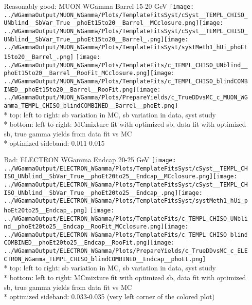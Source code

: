 \documentclass{beamer}
\begin{document}
\begin{frame}{Reasonably good: MUON WGamma Barrel 15-20 GeV}
  \texttt{[image: ../WGammaOutput/MUON\_WGamma/Plots/TemplateFitsSyst/cSyst\_\_TEMPL\_CHISO\_UNblind\_\_SbVar\_True\_\_phoEt15to20\_\_Barrel\_\_MCclosure.png]}\texttt{[image: ../WGammaOutput/MUON\_WGamma/Plots/TemplateFitsSyst/cSyst\_\_TEMPL\_CHISO\_UNblind\_\_SbVar\_True\_\_phoEt15to20\_\_Barrel\_.png]}\texttt{[image: ../WGammaOutput/MUON\_WGamma/Plots/TemplateFitsSyst/systMeth1\_hUi\_phoEt15to20\_\_Barrel\_.png]}
  \texttt{[image: ../WGammaOutput/MUON\_WGamma/Plots/TemplateFits/c\_TEMPL\_CHISO\_UNblind\_\_phoEt15to20\_\_Barrel\_\_RooFit\_MCclosure.png]}\texttt{[image: ../WGammaOutput/MUON\_WGamma/Plots/TemplateFits/c\_TEMPL\_CHISO\_blindCOMBINED\_\_phoEt15to20\_\_Barrel\_\_RooFit.png]}\texttt{[image: ../WGammaOutput/MUON\_WGamma/Plots/PrepareYields/c\_TrueDDvsMC\_c\_MUON\_WGamma\_TEMPL\_CHISO\_blindCOMBINED\_\_Barrel\_\_phoEt.png]}\\*
  \scriptsize top: left to right: sb variation in MC, sb variation in data, syst study\\*
  \scriptsize bottom: left to right: MCmixture fit with optimized sb, data fit with optimized sb, true gamma yields from data fit vs MC\\*
  \scriptsize optimized sideband: 0.011-0.015
\end{frame}

\begin{frame}{Bad: ELECTRON WGamma Endcap 20-25 GeV}
  \texttt{[image: ../WGammaOutput/ELECTRON\_WGamma/Plots/TemplateFitsSyst/cSyst\_\_TEMPL\_CHISO\_UNblind\_\_SbVar\_True\_\_phoEt20to25\_\_Endcap\_\_MCclosure.png]}\texttt{[image: ../WGammaOutput/ELECTRON\_WGamma/Plots/TemplateFitsSyst/cSyst\_\_TEMPL\_CHISO\_UNblind\_\_SbVar\_True\_\_phoEt20to25\_\_Endcap\_.png]}\texttt{[image: ../WGammaOutput/ELECTRON\_WGamma/Plots/TemplateFitsSyst/systMeth1\_hUi\_phoEt20to25\_\_Endcap\_.png]}
  \texttt{[image: ../WGammaOutput/ELECTRON\_WGamma/Plots/TemplateFits/c\_TEMPL\_CHISO\_UNblind\_\_phoEt20to25\_\_Endcap\_\_RooFit\_MCclosure.png]}\texttt{[image: ../WGammaOutput/ELECTRON\_WGamma/Plots/TemplateFits/c\_TEMPL\_CHISO\_blindCOMBINED\_\_phoEt20to25\_\_Endcap\_\_RooFit.png]}\texttt{[image: ../WGammaOutput/ELECTRON\_WGamma/Plots/PrepareYields/c\_TrueDDvsMC\_c\_ELECTRON\_WGamma\_TEMPL\_CHISO\_blindCOMBINED\_\_Endcap\_\_phoEt.png]}\\*
  \scriptsize top: left to right: sb variation in MC, sb variation in data, syst study\\*
  \scriptsize bottom: left to right: MCmixture fit with optimized sb, data fit with optimized sb, true gamma yields from data fit vs MC\\*
  \scriptsize optimized sideband: 0.033-0.035 (very left corner of the colored plot)
\end{frame}
\end{document}
